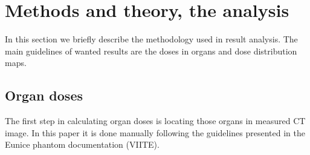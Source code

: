\documentclass[fleqn,10pt]{SelfArx} %
\begin{document}



%



\section{Methods and theory, the analysis}
In this section we briefly describe the methodology used in result analysis. The main guidelines of wanted results are the doses in organs and dose distribution maps.

\subsection{Organ doses}
\label{subsec:OrganDoses}
The first step in calculating organ doses is locating those organs in measured CT image. In this paper it is done manually following the guidelines presented in the Eunice phantom documentation (VIITE).
\end{document}
